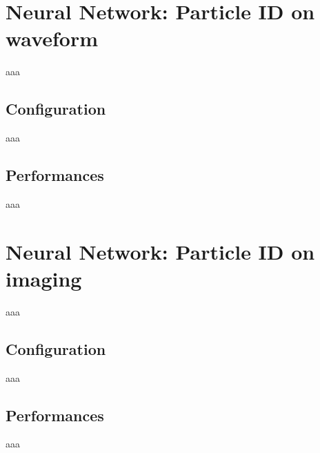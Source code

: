 \section{Neural Network: Particle ID on waveform} \label{sec:NN_waveform}
aaa

\subsection{Configuration}
aaa

\subsection{Performances}
aaa

\section{Neural Network: Particle ID on imaging} \label{sec:NN_img}
aaa

\subsection{Configuration}
aaa

\subsection{Performances}
aaa